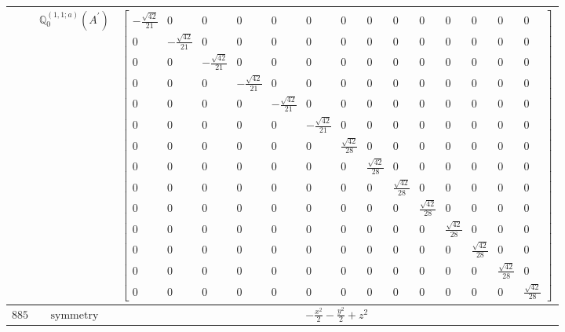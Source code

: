 \documentclass[fleqn,8pt,landscape]{jsarticle}
\begin{document}
\begin{longtable}{ccc}
$  $ & $ \mathbb{Q}_{0}^{(1,1;a)}(A^{\prime}) $ & $ \begin{bmatrix} - \frac{\sqrt{42}}{21} & 0 & 0 & 0 & 0 & 0 & 0 & 0 & 0 & 0 & 0 & 0 & 0 & 0 \\ 0 & - \frac{\sqrt{42}}{21} & 0 & 0 & 0 & 0 & 0 & 0 & 0 & 0 & 0 & 0 & 0 & 0 \\ 0 & 0 & - \frac{\sqrt{42}}{21} & 0 & 0 & 0 & 0 & 0 & 0 & 0 & 0 & 0 & 0 & 0 \\ 0 & 0 & 0 & - \frac{\sqrt{42}}{21} & 0 & 0 & 0 & 0 & 0 & 0 & 0 & 0 & 0 & 0 \\ 0 & 0 & 0 & 0 & - \frac{\sqrt{42}}{21} & 0 & 0 & 0 & 0 & 0 & 0 & 0 & 0 & 0 \\ 0 & 0 & 0 & 0 & 0 & - \frac{\sqrt{42}}{21} & 0 & 0 & 0 & 0 & 0 & 0 & 0 & 0 \\ 0 & 0 & 0 & 0 & 0 & 0 & \frac{\sqrt{42}}{28} & 0 & 0 & 0 & 0 & 0 & 0 & 0 \\ 0 & 0 & 0 & 0 & 0 & 0 & 0 & \frac{\sqrt{42}}{28} & 0 & 0 & 0 & 0 & 0 & 0 \\ 0 & 0 & 0 & 0 & 0 & 0 & 0 & 0 & \frac{\sqrt{42}}{28} & 0 & 0 & 0 & 0 & 0 \\ 0 & 0 & 0 & 0 & 0 & 0 & 0 & 0 & 0 & \frac{\sqrt{42}}{28} & 0 & 0 & 0 & 0 \\ 0 & 0 & 0 & 0 & 0 & 0 & 0 & 0 & 0 & 0 & \frac{\sqrt{42}}{28} & 0 & 0 & 0 \\ 0 & 0 & 0 & 0 & 0 & 0 & 0 & 0 & 0 & 0 & 0 & \frac{\sqrt{42}}{28} & 0 & 0 \\ 0 & 0 & 0 & 0 & 0 & 0 & 0 & 0 & 0 & 0 & 0 & 0 & \frac{\sqrt{42}}{28} & 0 \\ 0 & 0 & 0 & 0 & 0 & 0 & 0 & 0 & 0 & 0 & 0 & 0 & 0 & \frac{\sqrt{42}}{28} \end{bmatrix} $ \\ \hline
$ 885 $ & $ \text{symmetry} $ & $ - \frac{x^{2}}{2} - \frac{y^{2}}{2} + z^{2} $ \\

\end{longtable}
\end{document}

